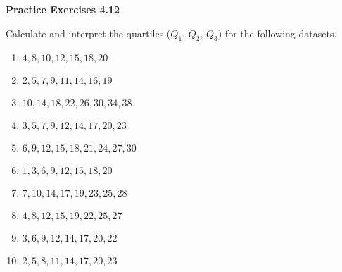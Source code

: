 \vspace{0.3ex}
\noindent\textbf{Practice Exercises 4.12}

\vspace{0.2ex}

Calculate and interpret the quartiles (\(Q_1\), \(Q_2\), \(Q_3\)) for the following datasets. 

\begin{enumerate}
    \item \(4, 8, 10, 12, 15, 18, 20\)  
    \item \(2, 5, 7, 9, 11, 14, 16, 19\)  
    \item \(10, 14, 18, 22, 26, 30, 34, 38\)  
    \item \(3, 5, 7, 9, 12, 14, 17, 20, 23\)  
    \item \(6, 9, 12, 15, 18, 21, 24, 27, 30\)  
    \item \(1, 3, 6, 9, 12, 15, 18, 20\)  
    \item \(7, 10, 14, 17, 19, 23, 25, 28\)  
    \item \(4, 8, 12, 15, 19, 22, 25, 27\)  
    \item \(3, 6, 9, 12, 14, 17, 20, 22\)  
    \item \(2, 5, 8, 11, 14, 17, 20, 23\)  
\end{enumerate}
